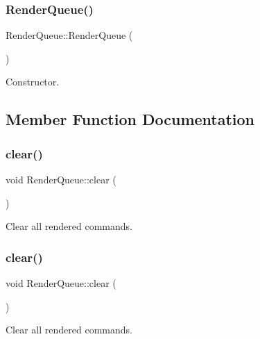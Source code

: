 \subsubsection{\texorpdfstring{Render\+Queue()}{RenderQueue()}\hspace{0.1cm}{\footnotesize\ttfamily [2/2]}}
{\footnotesize\ttfamily Render\+Queue\+::\+Render\+Queue (\begin{DoxyParamCaption}{ }\end{DoxyParamCaption})}

Constructor. 

\subsection{Member Function Documentation}
\mbox{\label{classRenderQueue_a8f4c44eedd6d9cc788100022ed725568}} 
\subsubsection{\texorpdfstring{clear()}{clear()}\hspace{0.1cm}{\footnotesize\ttfamily [1/2]}}
{\footnotesize\ttfamily void Render\+Queue\+::clear (\begin{DoxyParamCaption}{ }\end{DoxyParamCaption})}

Clear all rendered commands. \mbox{\label{classRenderQueue_a8f4c44eedd6d9cc788100022ed725568}} 
\subsubsection{\texorpdfstring{clear()}{clear()}\hspace{0.1cm}{\footnotesize\ttfamily [2/2]}}
{\footnotesize\ttfamily void Render\+Queue\+::clear (\begin{DoxyParamCaption}{ }\end{DoxyParamCaption})}

Clear all rendered commands. \mbox{\label{classRenderQueue_af6486c291c439094adcd12d197a8f200}} 
